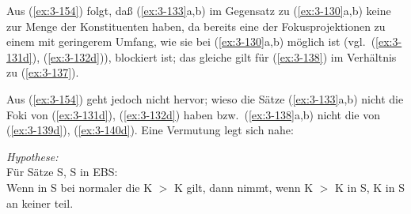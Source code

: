 \documentclass[output=paper]{langsci/langscibook}
\begin{document}
Aus (\ref{ex:3-154}) folgt, daß (\ref{ex:3-133}a,b) im Gegensatz zu (\ref{ex:3-130}a,b) keine  zur Menge der Konstituenten haben, da bereits eine der Fokusprojektionen zu einem  mit geringerem Umfang, wie sie bei (\ref{ex:3-130}a,b) möglich ist (vgl.\ (\ref{ex:3-131d}), (\ref{ex:3-132d})), blockiert ist; das gleiche gilt für (\ref{ex:3-138}) im Verhältnis zu (\ref{ex:3-137}).

\addlines
Aus (\ref{ex:3-154}) geht jedoch nicht hervor; wieso die Sätze (\ref{ex:3-133}a,b) nicht
die Foki von (\ref{ex:3-131d}), (\ref{ex:3-132d}) haben bzw.\ (\ref{ex:3-138}a,b) nicht die von (\ref{ex:3-139d}), (\ref{ex:3-140d}). Eine Vermutung legt sich nahe:
\begin{exe}
\ex\label{ex:3-155}
\textit{Hypothese:} \\
Für Sätze S, S in EBS: \\
Wenn in S bei normaler  die  K
$>$ K gilt, dann nimmt, wenn K $>$ K in S, K in
S an keiner  teil.
\end{exe}
\end{document}
